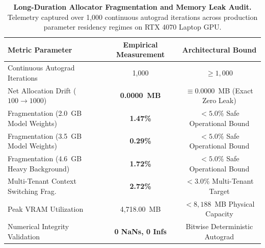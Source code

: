 \documentclass[journal]{IEEEtran}
\begin{document}
\begin{table}[h]
\centering
\small
\caption{\textbf{Long-Duration Allocator Fragmentation and Memory Leak Audit.} Telemetry captured over 1,000 continuous autograd iterations across production parameter residency regimes on RTX 4070 Laptop GPU.}
\label{tab:fragmentation_audit}
\begin{tabular}{l c c}
\toprule
Metric Parameter & Empirical Measurement & Architectural Bound \\
\midrule
Continuous Autograd Iterations & 1,000 & $\ge 1,000$ \\
Net Allocation Drift ($100 \to 1000$) & \textbf{0.0000~MB} & $\equiv 0.0000$~MB (Exact Zero Leak) \\
Fragmentation (2.0~GB Model Weights) & \textbf{1.47\%} & $< 5.0\%$ Safe Operational Bound \\
Fragmentation (3.5~GB Model Weights) & \textbf{0.29\%} & $< 5.0\%$ Safe Operational Bound \\
Fragmentation (4.6~GB Heavy Background) & \textbf{1.72\%} & $< 5.0\%$ Safe Operational Bound \\
Multi-Tenant Context Switching Frag. & \textbf{2.72\%} & $< 3.0\%$ Multi-Tenant Target \\
Peak VRAM Utilization & 4,718.00~MB & $< 8,188$~MB Physical Capacity \\
Numerical Integrity Validation & \textbf{0 NaNs, 0 Infs} & Bitwise Deterministic Autograd \\
\bottomrule
\end{tabular}
\end{table}
\end{document}
